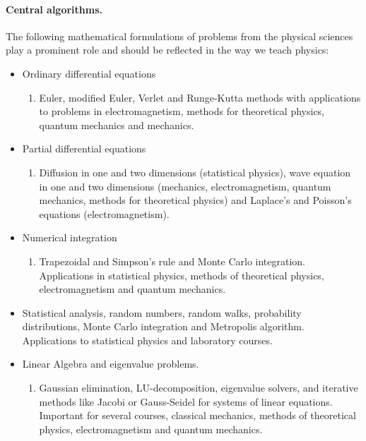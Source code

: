 \documentclass[%
oneside,                 %
final,                   %
10pt]{article}
\begin{document}
\paragraph{Central algorithms.}
The following mathematical formulations of problems from the physical sciences play a prominent role and should be reflected in the way we teach physics:
\begin{itemize}
 \item Ordinary differential equations
\begin{enumerate}

  \item Euler, modified Euler, Verlet and Runge-Kutta methods with applications to problems in electromagnetism, methods for theoretical physics, quantum mechanics and mechanics.

\end{enumerate}

\noindent
 \item Partial differential equations
\begin{enumerate}

  \item Diffusion in one and two dimensions (statistical physics), wave equation in one and two dimensions (mechanics, electromagnetism, quantum mechanics, methods for theoretical physics) and Laplace's and Poisson's equations (electromagnetism).

\end{enumerate}

\noindent
 \item Numerical integration 
\begin{enumerate}

  \item Trapezoidal and Simpson's rule and Monte Carlo integration. Applications in statistical physics, methods of theoretical physics, electromagnetism and quantum mechanics.

\end{enumerate}

\noindent
 \item Statistical analysis, random numbers, random walks, probability distributions, Monte Carlo integration and Metropolis algorithm. Applications to statistical physics and laboratory courses.

 \item Linear Algebra and eigenvalue problems. 
\begin{enumerate}

  \item Gaussian elimination, LU-decomposition, eigenvalue solvers, and iterative methods like  Jacobi or Gauss-Seidel for systems of linear equations. Important for several courses, classical mechanics, methods of theoretical physics, electromagnetism and quantum mechanics.


\end{enumerate}
\end{itemize}
\end{document}
